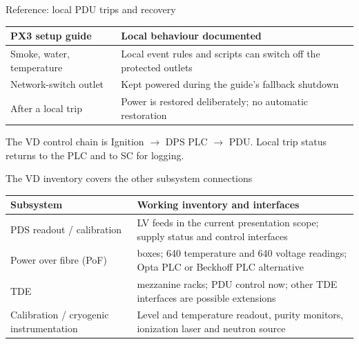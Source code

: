 \begin{frame}{Reference: local PDU trips and recovery}
  \renewcommand{\arraystretch}{1.45}
  \begin{tabularx}{\textwidth}{@{}>{\RaggedRight\arraybackslash}p{3.7cm}>{\RaggedRight\arraybackslash}X@{}}
    \toprule
    \textbf{PX3 setup guide} & \textbf{Local behaviour documented}\\
    \midrule
    Smoke, water, temperature & Local event rules and scripts can switch off the protected outlets\\
    Network-switch outlet & Kept powered during the guide's fallback shutdown\\
    After a local trip & Power is restored deliberately; no automatic restoration\\
    \bottomrule
  \end{tabularx}\par
  \bigskip
  The VD control chain is Ignition $\rightarrow$ DPS PLC $\rightarrow$ PDU.
  Local trip status returns to the PLC and to SC for logging.
\end{frame}

\begin{frame}{The VD inventory covers the other subsystem connections}
  \renewcommand{\arraystretch}{1.35}
  \begin{tabularx}{\textwidth}{@{}>{\RaggedRight\arraybackslash}p{3.2cm}>{\RaggedRight\arraybackslash}X@{}}
    \toprule
    \textbf{Subsystem} & \textbf{Working inventory and interfaces}\\
    \midrule
    PDS readout / calibration & 34 LV feeds in the current presentation scope; supply status and control interfaces\\
    Power over fibre (PoF) & 80 boxes; 640 temperature and 640 voltage readings; Opta PLC or Beckhoff PLC alternative\\
    TDE & 20 mezzanine racks; PDU control now; other TDE interfaces are possible extensions\\
    Calibration / cryogenic instrumentation & Level and temperature readout, purity monitors, ionization laser and neutron source\\
    \bottomrule
  \end{tabularx}
\end{frame}

